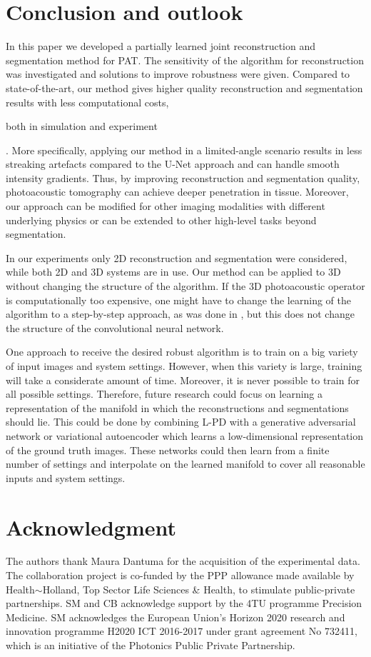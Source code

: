 \documentclass[journal]{IEEEtran}
\newcommand{\hl}[1]{\cbcolor{red}\begin{changebar}{#1}\end{changebar}}
\begin{document}
\section{Conclusion and outlook}\label{sec:conclusion}
In this paper we developed a partially learned joint reconstruction and segmentation method for PAT. The sensitivity of the algorithm for reconstruction was investigated and solutions to improve robustness were given. Compared to state-of-the-art, our method gives higher quality reconstruction and segmentation results with less computational costs, \hl{both in simulation and experiment}. More specifically, applying our method in a limited-angle scenario results in less streaking artefacts compared to the U-Net approach and can handle smooth intensity gradients. Thus, by improving reconstruction and segmentation quality, photoacoustic tomography can achieve deeper penetration in tissue. Moreover, our approach can be modified for other imaging modalities with different underlying physics or can be extended to other high-level tasks beyond segmentation. 

In our experiments only 2D reconstruction and segmentation were considered, while both 2D \cite{Li2018} and 3D systems \cite{Toi2017} are in use. Our method can be applied to 3D without changing the structure of the algorithm. If the 3D photoacoustic operator is computationally too expensive, one might have to change the learning of the algorithm to a step-by-step approach, as was done in \cite{Hauptmann2018}, but this does not change the structure of the convolutional neural network.

One approach to receive the desired robust algorithm is to train on a big variety of input images and system settings. However, when this variety is large, training will take a considerate amount of time. Moreover, it is never possible to train for all possible settings. Therefore, future research could focus on learning a representation of the manifold in which the reconstructions and segmentations should lie. This could be done by combining L-PD with a generative adversarial network \cite{Goodfellow2014} or variational autoencoder \cite{Kingma2013} which learns a low-dimensional representation of the ground truth images. These networks could then learn from a finite number of settings and interpolate on the learned manifold to cover all reasonable inputs and system settings. 

\section*{Acknowledgment}
The authors thank Maura Dantuma for the acquisition of the experimental data. The collaboration project is co-funded by the PPP allowance made available by Health$\sim$Holland, Top Sector Life Sciences \& Health, to stimulate public-private partnerships. SM and CB acknowledge support by the 4TU programme Precision Medicine. SM acknowledges the European Union’s Horizon 2020 research and innovation programme H2020 ICT 2016-2017 under grant agreement No 732411, which is an initiative of the Photonics Public Private Partnership.
\end{document}
